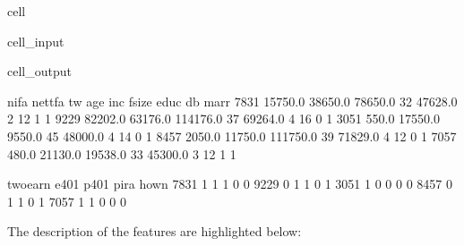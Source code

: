 \documentclass[letterpaper,10pt,english]{jupyterBook}
\begin{document}
\begin{sphinxuseclass}{cell}\begin{sphinxVerbatimInput}

\begin{sphinxuseclass}{cell_input}
\begin{sphinxVerbatim}[commandchars=\\\{\}]
  
\end{sphinxVerbatim}

\end{sphinxuseclass}\end{sphinxVerbatimInput}
\begin{sphinxVerbatimOutput}

\begin{sphinxuseclass}{cell_output}
\begin{sphinxVerbatim}[commandchars=\\\{\}]
         nifa  net\PYGZus{}tfa        tw  age      inc  fsize  educ  db  marr  \PYGZbs{}
7831  15750.0  38650.0   78650.0   32  47628.0      2    12   1     1   
9229  82202.0  63176.0  114176.0   37  69264.0      4    16   0     1   
3051    550.0 \PYGZhy{}17550.0   \PYGZhy{}9550.0   45  48000.0      4    14   0     1   
8457   2050.0  11750.0  111750.0   39  71829.0      4    12   0     1   
7057    480.0 \PYGZhy{}21130.0  \PYGZhy{}19538.0   33  45300.0      3    12   1     1   

      twoearn  e401  p401  pira  hown  
7831        1     1     1     0     0  
9229        0     1     1     0     1  
3051        1     0     0     0     0  
8457        0     1     1     0     1  
7057        1     1     0     0     0  
\end{sphinxVerbatim}

\end{sphinxuseclass}\end{sphinxVerbatimOutput}

\end{sphinxuseclass}
\sphinxAtStartPar
The description of the features are highlighted below:
\end{document}
